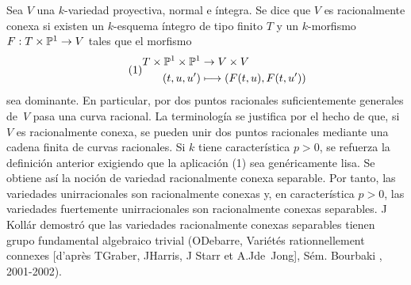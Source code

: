 {\begin{remarques}
Sea $V$ una $k$-variedad proyectiva, normal e íntegra. Se dice que $V$ es
racionalmente conexa si existen un $k$-esquema íntegro de tipo finito $T$ y
un $k$-morfismo $F : T\times\mathbb P^1\to V$ tales que el morfismo
\begin{equation}\tag*{(1)}
\begin{split}
T \times\mathbb P^1\times\mathbb P^1&\to V\times V\\
(t, u, u')&\longmapsto(F(t,u), F(t,u'))
\end{split}
\end{equation}
sea dominante. En particular, por dos puntos racionales suficientemente
generales de~$V$ pasa una curva racional. La terminología se justifica por
el hecho de que, si $V$ es racionalmente conexa, se pueden unir dos puntos
racionales mediante una cadena finita de curvas racionales. Si $k$ tiene
característica $p>0$, se refuerza la definición anterior exigiendo que la
aplicación (1) sea genéricamente lisa. Se obtiene así la noción de variedad
racionalmente conexa separable. Por tanto, las variedades unirracionales son
racionalmente conexas y, en característica $p>0$, las variedades
fuertemente unirracionales son racionalmente conexas separables. J\ptbl
Kollár demostró que las variedades racionalmente conexas separables tienen
grupo fundamental algebraico trivial (\cf O\ptbl Debarre, Variétés
rationnellement connexes [d'après T\ptbl Graber, J\ptbl Harris, J\ptbl
Starr et A.J\ptbl de~Jong], Sém. Bourbaki , 2001-2002).\rcrochetbf
\end{remarques}}
